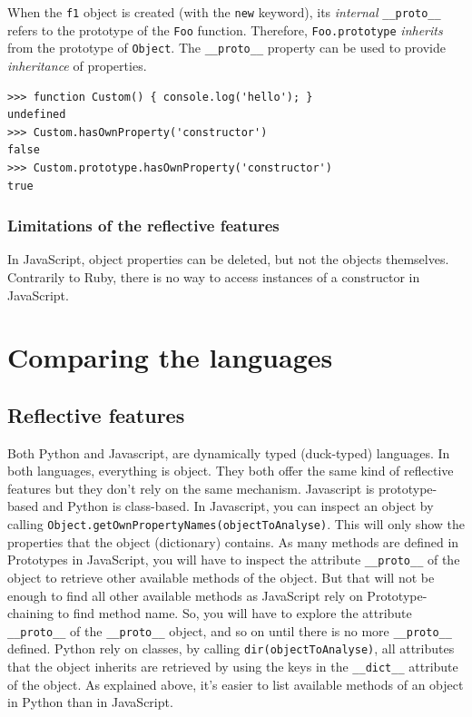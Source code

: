 \documentclass[a4paper,10pt]{article}
\begin{document}
When the \lstinline|f1| object is created (with the \lstinline|new| keyword), its \textit{internal} \lstinline|__proto__| refers to the prototype of the \lstinline|Foo| function.
Therefore, \lstinline|Foo.prototype| \textit{inherits} from the prototype of \lstinline|Object|.
The \lstinline|__proto__| property can be used to provide \textit{inheritance} of properties.

\begin{lstlisting}
>>> function Custom() { console.log('hello'); }
undefined
>>> Custom.hasOwnProperty('constructor')
false
>>> Custom.prototype.hasOwnProperty('constructor')
true
\end{lstlisting}


\subsubsection{Limitations of the reflective features}

In JavaScript, object properties can be deleted, but not the objects themselves.
Contrarily to Ruby, there is no way to access instances of a constructor in JavaScript.




\newpage
\section{Comparing the languages}

\subsection{Reflective features}

Both Python and Javascript, are dynamically typed (duck-typed) languages.
In both languages, everything is object.
They both offer the same kind of reflective features but they don't rely on the same mechanism.
Javascript is prototype-based and Python is class-based.
In Javascript, you can inspect an object by calling \setjs \mbox{\lstinline|Object.getOwnPropertyNames(objectToAnalyse)|}.
This will only show the properties that the object (dictionary) contains.
As many methods are defined in Prototypes in JavaScript, you will have to inspect the attribute \lstinline|__proto__| of the object to retrieve other available methods of the object.
But that will not be enough to find all other available methods as JavaScript rely on Prototype-chaining to find method name.
So, you will have to explore the attribute \lstinline|__proto__| of the \lstinline|__proto__| object, and so on until there is no more \lstinline|__proto__| defined.
\setpy
Python rely on classes, by calling \lstinline|dir(objectToAnalyse)|, all attributes that the object inherits are retrieved by using the keys in the \lstinline|__dict__| attribute of the object. As explained above, it's easier to list available methods of an object in Python than in JavaScript.
\end{document}
